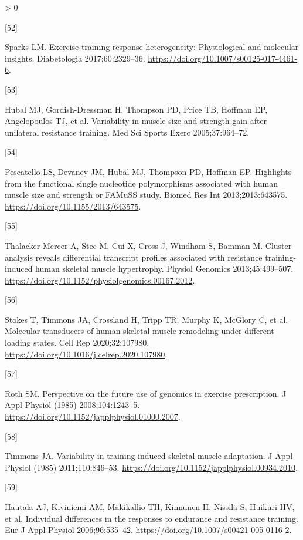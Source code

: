 \documentclass[twoside,10pt]{gihclass} %
\newlength{\cslhangindent}
\newlength{\csllabelwidth}
\newenvironment{CSLReferences}[3] %
 {%
  \setlength{\parindent}{0pt}
  \ifodd #1 \everypar{\setlength{\hangindent}{\cslhangindent}}\ignorespaces\fi
  \ifnum #2 > 0
  \setlength{\parskip}{#2\baselineskip}
  \fi
 }%
 {}
\newcommand{\CSLLeftMargin}[1]{\parbox[t]{\maxof{\widthof{#1}}{\csllabelwidth}}{#1}}
\newcommand{\CSLRightInline}[1]{\parbox[t]{\linewidth}{#1}}
\begin{document}
\begin{CSLReferences}{0}{0}
\leavevmode\hypertarget{ref-RN2677}{}%
\CSLLeftMargin{{[}52{]} }
\CSLRightInline{Sparks LM. Exercise training response heterogeneity: Physiological and molecular insights. Diabetologia 2017;60:2329--36. \url{https://doi.org/10.1007/s00125-017-4461-6}.}

\leavevmode\hypertarget{ref-RN764}{}%
\CSLLeftMargin{{[}53{]} }
\CSLRightInline{Hubal MJ, Gordish-Dressman H, Thompson PD, Price TB, Hoffman EP, Angelopoulos TJ, et al. Variability in muscle size and strength gain after unilateral resistance training. Med Sci Sports Exerc 2005;37:964--72.}

\leavevmode\hypertarget{ref-RN1263}{}%
\CSLLeftMargin{{[}54{]} }
\CSLRightInline{Pescatello LS, Devaney JM, Hubal MJ, Thompson PD, Hoffman EP. Highlights from the functional single nucleotide polymorphisms associated with human muscle size and strength or FAMuSS study. Biomed Res Int 2013;2013:643575. \url{https://doi.org/10.1155/2013/643575}.}

\leavevmode\hypertarget{ref-RN826}{}%
\CSLLeftMargin{{[}55{]} }
\CSLRightInline{Thalacker-Mercer A, Stec M, Cui X, Cross J, Windham S, Bamman M. Cluster analysis reveals differential transcript profiles associated with resistance training-induced human skeletal muscle hypertrophy. Physiol Genomics 2013;45:499--507. \url{https://doi.org/10.1152/physiolgenomics.00167.2012}.}

\leavevmode\hypertarget{ref-RN2684}{}%
\CSLLeftMargin{{[}56{]} }
\CSLRightInline{Stokes T, Timmons JA, Crossland H, Tripp TR, Murphy K, McGlory C, et al. Molecular transducers of human skeletal muscle remodeling under different loading states. Cell Rep 2020;32:107980. \url{https://doi.org/10.1016/j.celrep.2020.107980}.}

\leavevmode\hypertarget{ref-RN2698}{}%
\CSLLeftMargin{{[}57{]} }
\CSLRightInline{Roth SM. Perspective on the future use of genomics in exercise prescription. J Appl Physiol (1985) 2008;104:1243--5. \url{https://doi.org/10.1152/japplphysiol.01000.2007}.}

\leavevmode\hypertarget{ref-RN758}{}%
\CSLLeftMargin{{[}58{]} }
\CSLRightInline{Timmons JA. Variability in training-induced skeletal muscle adaptation. J Appl Physiol (1985) 2011;110:846--53. \url{https://doi.org/10.1152/japplphysiol.00934.2010}.}

\leavevmode\hypertarget{ref-RN2681}{}%
\CSLLeftMargin{{[}59{]} }
\CSLRightInline{Hautala AJ, Kiviniemi AM, Mäkikallio TH, Kinnunen H, Nissilä S, Huikuri HV, et al. Individual differences in the responses to endurance and resistance training. Eur J Appl Physiol 2006;96:535--42. \url{https://doi.org/10.1007/s00421-005-0116-2}.}


\end{CSLReferences}
\end{document}
